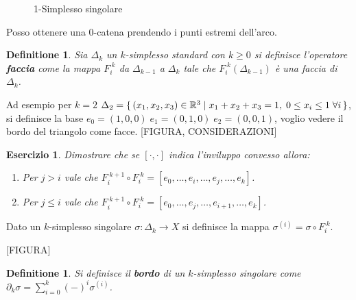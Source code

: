 \documentclass{article}
\newtheorem{definition}[theorem]{Definitione}
\newcounter{exercises}
\newtheorem{exercise}[exercises]{Esercizio}
\newcommand{\RN}[1][]{\mathbb{R}^#1}
\begin{document}
\begin{figure}[htbp]
  \centering
  \caption{1-Simplesso singolare}
  \label{fig:lez1:1_standard_simplex_with_arc}
\end{figure}

Posso ottenere una $ 0 $-catena prendendo i punti estremi dell'arco.

\begin{definition}
  Sia $ \Delta_k $ un $ k $-simplesso standard con $ k \geq 0 $ si definisce l'operatore \textbf{faccia} come
  la mappa $ F_i^{\;k} $ da $ \Delta_{k-1} $ a $ \Delta_k $ tale che $ F_i^{\;k}(\Delta_{k-1}) $ è una faccia di $ \Delta_k $.
\end{definition}

Ad esempio per $ k = 2 $ $ \Delta_2 = \set{ (x_1,x_2,x_3) \in \RN{3} | x_1 + x_2 + x_3 = 1, \; 0 \leq x_i \leq 1 \; \forall i} $,
si definisce la base $ e_0 = (1,0,0) \; e_1 = (0,1,0) \; e_2 = (0,0,1) $, voglio vedere il bordo del triangolo
come facce.
[FIGURA, CONSIDERAZIONI]

\begin{exercise}
  Dimostrare che se $ [\cdot, \cdot] $ indica l'inviluppo convesso allora:
  \begin{enumerate}
  \item Per $ j > i $ vale che $ F_i^{\; k+1} \circ F_i^{\; k} = [e_0, \dots, e_i, \dots, e_j, \dots, e_k ] $.
  \item Per $ j \leq i $ vale che $ F_i^{\; k+1} \circ F_i^{\; k} = [e_0, \dots, e_j, \dots, e_{i+1}, \dots, e_k ] $.
  \end{enumerate}
\end{exercise}

Dato un $ k $-simplesso singolare $ \sigma: \Delta_k \to X $ si definisce la mappa $ \sigma^{(i)} = \sigma \circ F_i^{\; k} $.

[FIGURA]

\begin{definition}
  Si definisce il \textbf{bordo} di un $ k $-simplesso singolare come $ \partial_k \sigma = \sum_{i=0}^{k}(-)^i \sigma^{(i)} $.
\end{definition}
\end{document}
